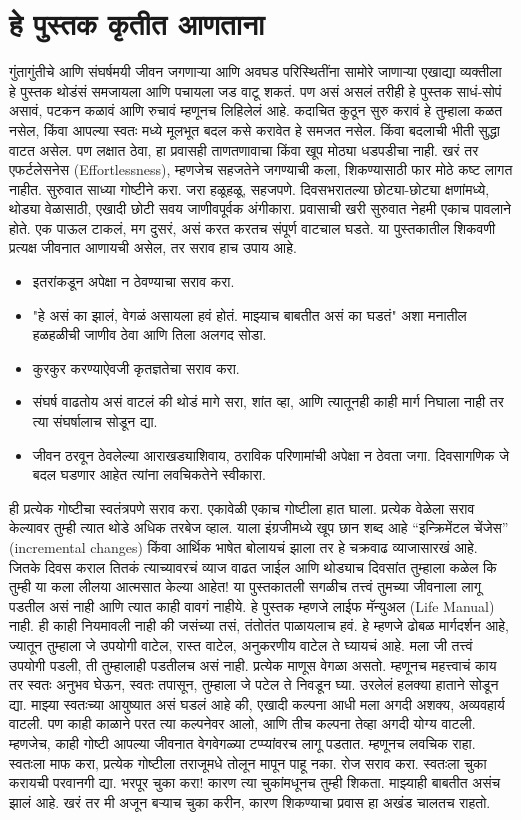  \chapter{हे पुस्तक कृतीत आणताना}
गुंतागुंतीचे आणि संघर्षमयी जीवन जगणाऱ्या आणि अवघड परिस्थितींना सामोरे जाणाऱ्या एखाद्या व्यक्तीला हे पुस्तक थोडंसं समजायला आणि पचायला जड वाटू शकतं. पण असं असलं तरीही हे पुस्तक साधं-सोपं असावं, पटकन कळावं आणि रुचावं म्हणूनच लिहिलेलं आहे.
कदाचित कुठून सुरु करावं हे तुम्हाला कळत नसेल, किंवा आपल्या स्वतः मध्ये मूलभूत बदल कसे करावेत हे समजत नसेल. किंवा बदलाची भीती सुद्धा वाटत असेल. पण लक्षात ठेवा,  हा प्रवासही ताणतणावाचा किंवा खूप मोठ्या धडपडीचा नाही. खरं तर एफर्टलेसनेस (Effortlessness),  म्हणजेच सहजतेने जगण्याची कला,  शिकण्यासाठी फार मोठे कष्ट लागत नाहीत.
सुरुवात साध्या गोष्टीने करा. जरा हळूहळू, सहजपणे. दिवसभरातल्या छोट्या-छोट्या क्षणांमध्ये, थोड्या वेळासाठी, एखादी छोटी सवय जाणीवपूर्वक अंगीकारा.
प्रवासाची खरी सुरुवात नेहमी एकाच पावलाने होते. एक पाऊल टाकलं, मग दुसरं,  असं करत करतच संपूर्ण वाटचाल घडते.
या पुस्तकातील शिकवणी प्रत्यक्ष जीवनात आणायची असेल, तर सराव हाच उपाय आहे.
 \begin{itemize}
 \item इतरांकडून अपेक्षा न ठेवण्याचा सराव करा.
 \item "हे असं का झालं, वेगळं असायला हवं होतं. माझ्याच बाबतीत असं का घडतं" अशा मनातील हळहळीची जाणीव ठेवा आणि तिला अलगद सोडा.
 \item कुरकुर करण्याऐवजी कृतज्ञतेचा सराव करा.
 \item संघर्ष वाढतोय असं वाटलं की थोडं मागे सरा, शांत व्हा, आणि त्यातूनही काही मार्ग निघाला नाही तर त्या संघर्षालाच सोडून द्या.
 \item जीवन ठरवून ठेवलेल्या आराखड्याशिवाय, ठराविक परिणामांची अपेक्षा न ठेवता जगा. दिवसागणिक जे बदल घडणार आहेत त्यांना लवचिकतेने स्वीकारा.
 \end{itemize}
ही प्रत्येक गोष्टीचा स्वतंत्रपणे सराव करा. एकावेळी एकाच गोष्टीला हात घाला. प्रत्येक वेळेला सराव केल्यावर तुम्ही त्यात थोडे अधिक तरबेज व्हाल. याला इंग्रजीमध्ये खूप छान शब्द आहे “इन्क्रिमेंटल चेंजेस” (incremental changes) किंवा आर्थिक भाषेत बोलायचं झाला तर हे चक्रवाढ व्याजासारखं आहे. जितके दिवस कराल तितकं त्याच्यावरचं व्याज वाढत जाईल आणि थोड्याच दिवसांत तुम्हाला कळेल कि तुम्ही या कला लीलया आत्मसात केल्या आहेत!
या पुस्तकातली सगळीच तत्त्वं तुमच्या जीवनाला लागू पडतील असं नाही आणि त्यात काही वावगं नाहीये. हे पुस्तक म्हणजे लाईफ मॅन्युअल (Life Manual) नाही. ही काही नियमावली नाही की जसंच्या तसं, तंतोतंत पाळायलाच हवं. हे म्हणजे ढोबळ मार्गदर्शन आहे, ज्यातून तुम्हाला जे उपयोगी वाटेल, रास्त वाटेल, अनुकरणीय वाटेल ते घ्यायचं आहे. मला जी तत्त्वं उपयोगी पडली, ती तुम्हालाही पडतीलच असं नाही. प्रत्येक माणूस वेगळा असतो. म्हणूनच महत्त्वाचं काय तर स्वतः अनुभव घेऊन, स्वतः तपासून, तुम्हाला जे पटेल ते निवडून घ्या. उरलेलं हलक्या हाताने सोडून द्या.
माझ्या स्वतःच्या आयुष्यात असं घडलं आहे की, एखादी कल्पना आधी मला अगदी अशक्य, अव्यवहार्य वाटली. पण काही काळाने परत त्या कल्पनेवर आलो, आणि तीच कल्पना तेव्हा अगदी योग्य वाटली. म्हणजेच, काही गोष्टी आपल्या जीवनात वेगवेगळ्या टप्प्यांवरच लागू पडतात.
म्हणूनच लवचिक राहा. स्वतःला माफ करा, प्रत्येक गोष्टीला तराजूमधे तोलून मापून पाहू नका. रोज सराव करा. स्वतःला चुका करायची परवानगी द्या. भरपूर चुका करा! कारण त्या चुकांमधूनच तुम्ही शिकता. माझ्याही बाबतीत असंच झालं आहे. खरं तर मी अजून बऱ्याच चुका करीन, कारण शिकण्याचा प्रवास हा अखंड चालतच राहतो.


